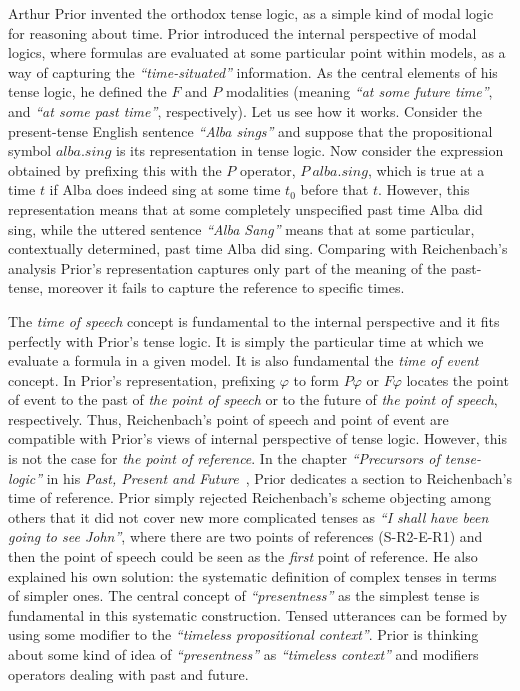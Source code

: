 Arthur Prior invented the orthodox tense logic, as a simple kind of modal
logic for reasoning about time. Prior introduced the internal perspective of
modal logics, where formulas are evaluated at some particular point within
models, as a way of capturing the \emph{``time-situated''} information. As the central
elements of his tense logic, he defined the $F$ and $P$ modalities (meaning 
\emph{``at some future time''}, and 
\emph{``at some past time''}, respectively). Let
us see how it works. Consider the present-tense English sentence 
\emph{``Alba sings''} and suppose that the
propositional symbol $\mathit{alba.sing}$ is its representation in tense logic. Now
consider the expression obtained by prefixing this with the $P$ operator, $%
P\ \mathit{alba.sing}$, which is true at a time $t$ if Alba does indeed sing at some
time $t_{0}$ before that $t$. However, this representation means that at
some completely unspecified past time Alba did sing, while the uttered
sentence \emph{``Alba Sang''} means that at some particular, contextually
determined, past time Alba did sing. Comparing with Reichenbach's analysis
Prior's representation captures only part of the meaning of the past-tense,
moreover it fails to capture the reference to specific times.

The \emph{time of speech} concept is fundamental to the internal
perspective and it fits perfectly with Prior's tense logic. It is simply the
particular time at which we evaluate a formula in a given model. It is also
fundamental the \emph{time of event} concept. In Prior's representation,
prefixing $\varphi $ to form $P\varphi $ or $F\varphi $ locates the point of
event to the past of \emph{the point of speech} or to the future of 
\emph{the point of speech}, respectively. Thus, Reichenbach's point of
speech and point of event are compatible with Prior's views of internal
perspective of tense logic. However, this is not the case for \emph{the
point of reference}. In the chapter 
\emph{``Precursors of tense-logic''} in his \emph{Past, Present and
Future}~\cite{Prior1967}, Prior dedicates a section to
Reichenbach's time of reference. Prior simply rejected Reichenbach's scheme
objecting among others that it did not cover new more complicated tenses as 
\emph{``I shall have been going to see John''}, where there are two points of references
(S-R2-E-R1) and then the point of speech could be seen as the 
\emph{first} point of reference. He also
explained his own solution: the systematic definition of complex tenses in
terms of simpler ones. The central concept of 
\emph{``presentness''} as the simplest tense is fundamental in this
systematic construction. Tensed utterances can be formed by using some
modifier to the \emph{``timeless propositional
context''}. Prior is thinking about some kind of idea of
\emph{``presentness''} as 
\emph{``timeless context''} and modifiers
operators dealing with past and future.

